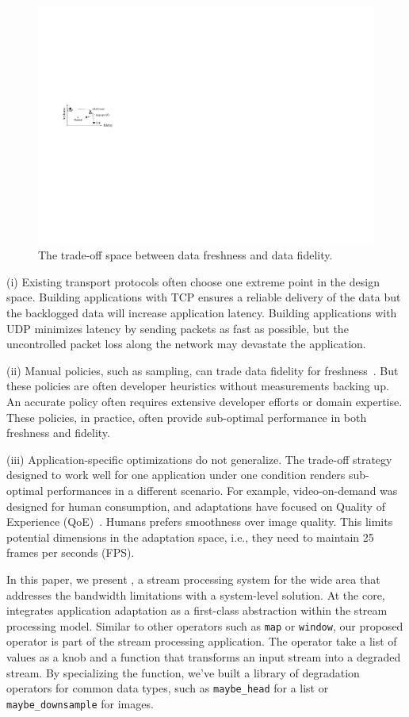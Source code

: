 \begin{figure}
  \centering
  \includegraphics[width=0.9\linewidth]{figures/intro.pdf}
  \caption{The trade-off space between data freshness and data fidelity.}
  \label{fig:intro}
  \vspace{-1em}
\end{figure}

(i) Existing transport protocols often choose one extreme point in the design
space. Building applications with TCP ensures a reliable delivery of the data
but the backlogged data will increase application latency. Building applications
with UDP minimizes latency by sending packets as fast as possible, but the
uncontrolled packet loss along the network may devastate the application.

(ii) Manual policies, such as sampling, can trade data fidelity for
freshness~\cite{rabkin2014aggregation}. But these policies are often developer
heuristics without measurements backing up. An accurate policy often requires
extensive developer efforts or domain expertise. These policies, in practice,
often provide sub-optimal performance in both freshness and fidelity.

(iii) Application-specific optimizations do not generalize. The trade-off
strategy designed to work well for one application under one condition renders
sub-optimal performances in a different scenario. For example, video-on-demand
was designed for human consumption, and adaptations have focused on Quality of
Experience (QoE)~\cite{yin2015control}. Humans prefers smoothness over image
quality. This limits potential dimensions in the adaptation space, i.e., they
need to maintain 25 frames per seconds (FPS).

In this paper, we present \sysname{}, a stream processing system for the wide
area that addresses the bandwidth limitations with a system-level solution. At
the core, \sysname{} integrates application adaptation as a first-class
abstraction within the stream processing model. Similar to other operators such
as \texttt{map} or \texttt{window}, our proposed \maybe{} operator is part of
the stream processing application. The operator take a list of values as a knob
and a function that transforms an input stream into a degraded stream. By
specializing the function, we've built a library of degradation operators for
common data types, such as \texttt{maybe\_head} for a list or
\texttt{maybe\_downsample} for images.

